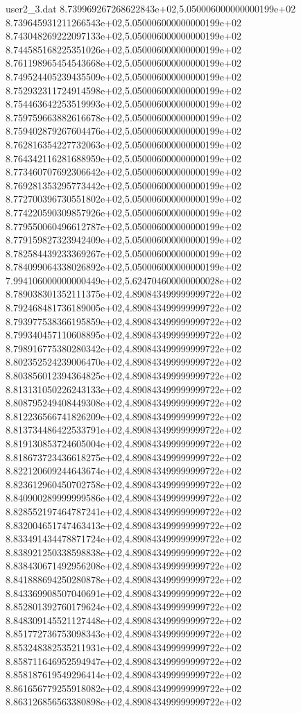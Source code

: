 \begin{filecontents}{user2_3.dat}
8.739969267268622843e+02,5.050006000000000199e+02
8.739645931211266543e+02,5.050006000000000199e+02
8.743048269222097133e+02,5.050006000000000199e+02
8.744585168225351026e+02,5.050006000000000199e+02
8.761198965454543668e+02,5.050006000000000199e+02
8.749524405239435509e+02,5.050006000000000199e+02
8.752932311724914598e+02,5.050006000000000199e+02
8.754463642253519993e+02,5.050006000000000199e+02
8.759759663882616678e+02,5.050006000000000199e+02
8.759402879267604476e+02,5.050006000000000199e+02
8.762816354227732063e+02,5.050006000000000199e+02
8.764342116281688959e+02,5.050006000000000199e+02
8.773460707692306642e+02,5.050006000000000199e+02
8.769281353295773442e+02,5.050006000000000199e+02
8.772700396730551802e+02,5.050006000000000199e+02
8.774220590309857926e+02,5.050006000000000199e+02
8.779550060496612787e+02,5.050006000000000199e+02
8.779159827323942409e+02,5.050006000000000199e+02
8.782584439233369267e+02,5.050006000000000199e+02
8.784099064338026892e+02,5.050006000000000199e+02
7.994106000000000449e+02,5.624704600000000028e+02
8.789038301352111375e+02,4.890843499999999722e+02
8.792468481736189005e+02,4.890843499999999722e+02
8.793977538366195859e+02,4.890843499999999722e+02
8.799340457110608895e+02,4.890843499999999722e+02
8.798916775380280342e+02,4.890843499999999722e+02
8.802352524239006470e+02,4.890843499999999722e+02
8.803856012394364825e+02,4.890843499999999722e+02
8.813131050226243133e+02,4.890843499999999722e+02
8.808795249408449308e+02,4.890843499999999722e+02
8.812236566741826209e+02,4.890843499999999722e+02
8.813734486422533791e+02,4.890843499999999722e+02
8.819130853724605004e+02,4.890843499999999722e+02
8.818673723436618275e+02,4.890843499999999722e+02
8.822120609244643674e+02,4.890843499999999722e+02
8.823612960450702758e+02,4.890843499999999722e+02
8.840900289999999586e+02,4.890843499999999722e+02
8.828552197464787241e+02,4.890843499999999722e+02
8.832004651747463413e+02,4.890843499999999722e+02
8.833491434478871724e+02,4.890843499999999722e+02
8.838921250338598838e+02,4.890843499999999722e+02
8.838430671492956208e+02,4.890843499999999722e+02
8.841888694250280878e+02,4.890843499999999722e+02
8.843369908507040691e+02,4.890843499999999722e+02
8.852801392760179624e+02,4.890843499999999722e+02
8.848309145521127448e+02,4.890843499999999722e+02
8.851772736753098343e+02,4.890843499999999722e+02
8.853248382535211931e+02,4.890843499999999722e+02
8.858711646952594947e+02,4.890843499999999722e+02
8.858187619549296414e+02,4.890843499999999722e+02
8.861656779255918082e+02,4.890843499999999722e+02
8.863126856563380898e+02,4.890843499999999722e+02

\end{filecontents}
